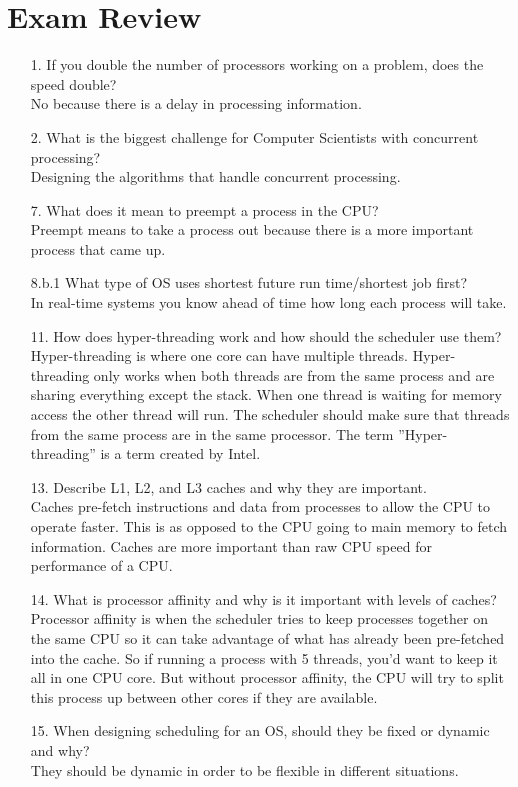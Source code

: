 \documentclass{report}
\begin{document}
\section{Exam Review}
\begin{enumerate}
	\item[1.]If you double the number of processors working on a problem, does the speed double?\\
	No because there is a delay in processing information.
	
	\item[2.] What is the biggest challenge for Computer Scientists with concurrent processing?\\
Designing the algorithms that handle concurrent processing.

	\item[7.]What does it mean to preempt a process in the CPU?\\
	Preempt means to take a process out because there is a more important process that came up.
	
	\item[8.b.1]What type of OS uses shortest future run time/shortest job first?\\
	In real-time systems you know ahead of time how long each process will take.

	\item[11.]How does hyper-threading work and how should the scheduler use them?\\
	Hyper-threading is where one core can have multiple threads. Hyper-threading only works when both threads are from the same process and are sharing everything except the stack. When one thread is waiting for memory access the other thread will run. The scheduler should make sure that threads from the same process are in the same processor. The term ''Hyper-threading'' is a term created by Intel.
	
	\item[13.]Describe L1, L2, and L3 caches and why they are important.\\
	Caches pre-fetch instructions and data from processes to allow the CPU to operate faster. This is as opposed to the CPU going to main memory to fetch information. Caches are more important than raw CPU speed for performance of a CPU.
	
	\item[14.]What is processor affinity and why is it important with levels of caches?\\
	Processor affinity is when the scheduler tries to keep processes together on the same CPU so it can take advantage of what has already been pre-fetched into the cache. So if running a process with 5 threads, you'd want to keep it all in one CPU core. But without processor affinity, the CPU will try to split this process up between other cores if they are available.
	
	\item[15.]When designing scheduling for an OS, should they be fixed or dynamic and why?\\
	They should be dynamic in order to be flexible in different situations.
\end{enumerate}
\end{document}
